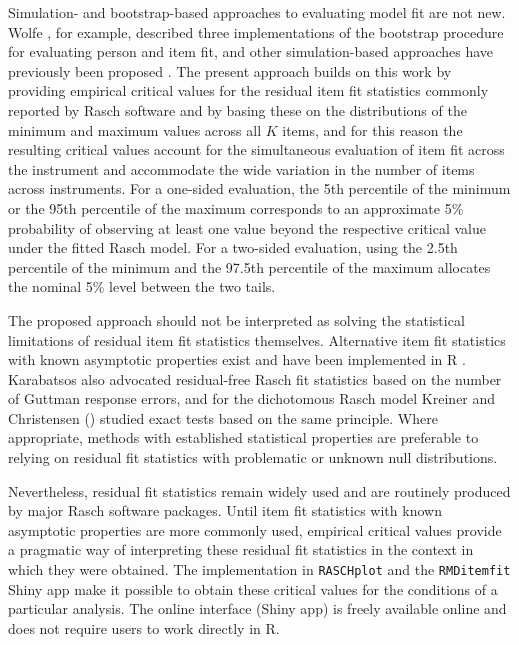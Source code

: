 \documentclass[11pt,a4paper]{article}
\begin{document}
Simulation- and bootstrap-based approaches to evaluating model fit are not new. Wolfe \citeyear{Wolfe-2013}, for example, described three implementations of the bootstrap procedure for evaluating person and item fit, and other simulation-based approaches have previously been proposed \cite{Stone-2000,Su-Sheu-Wang-et-al-2007,Hodge-Morgan-2017}. The present approach builds on this work by providing empirical critical values for the residual item fit statistics commonly reported by Rasch software and by basing these on the distributions of the minimum and maximum values across all $K$ items, and for this reason the resulting critical values account for the simultaneous evaluation of item fit across the instrument and accommodate the wide variation in the number of items across instruments. For a one-sided evaluation, the 5th percentile of the minimum or the 95th percentile of the maximum corresponds to an approximate 5\% probability of observing at least one value beyond the respective critical value under the fitted Rasch model. For a two-sided evaluation, using the 2.5th percentile of the minimum and the 97.5th percentile of the maximum allocates the nominal 5\% level between the two tails.

The proposed approach should not be interpreted as solving the statistical limitations of residual item fit statistics themselves. Alternative item fit statistics with known asymptotic properties exist \cite{Christensen-Kreiner-2013,Muller-2020a,Johansson-2025} and have been implemented in R \cite{Muller-2020b}. Karabatsos \cite{Karabatsos-2000} also advocated residual-free Rasch fit statistics based on the number of Guttman response errors, and for the dichotomous Rasch model Kreiner and Christensen (\citeyear{Christensen-Kreiner-2010}) studied exact tests based on the same principle. Where appropriate, methods with established statistical properties are preferable to relying on residual fit statistics with problematic or unknown null distributions.

Nevertheless, residual fit statistics remain widely used and are routinely produced by major Rasch software packages. Until item fit statistics with known asymptotic properties are more commonly used, empirical critical values provide a pragmatic way of interpreting these residual fit statistics in the context in which they were obtained. The implementation in \texttt{RASCHplot} and the \texttt{RMDitemfit} Shiny app make it possible to obtain these critical values for the conditions of a particular analysis. The online interface (Shiny app) is freely available online and does not require users to work directly in R.
\end{document}
